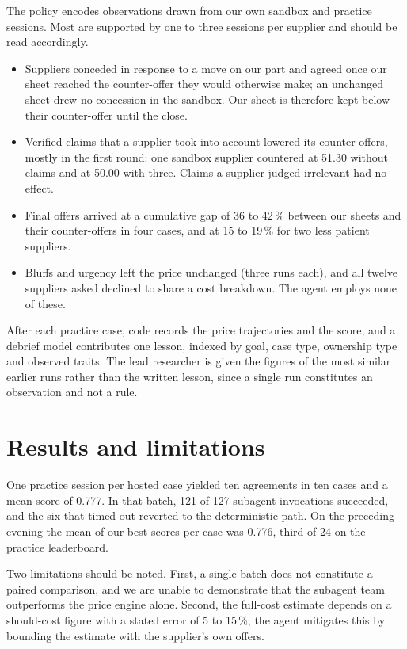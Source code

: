 \documentclass[10pt,a4paper,twocolumn]{article}
\begin{document}
The policy encodes observations drawn from our own sandbox and practice sessions. Most are
supported by one to three sessions per supplier and should be read accordingly.
\begin{itemize}
\item Suppliers conceded in response to a move on our part and agreed once our sheet reached the
  counter-offer they would otherwise make; an unchanged sheet drew no concession in the sandbox.
  Our sheet is therefore kept below their counter-offer until the close.
\item Verified claims that a supplier took into account lowered its counter-offers, mostly in the
  first round: one sandbox supplier countered at 51.30 without claims and at 50.00 with three.
  Claims a supplier judged irrelevant had no effect.
\item Final offers arrived at a cumulative gap of 36 to 42\,\% between our sheets and their
  counter-offers in four cases, and at 15 to 19\,\% for two less patient suppliers.
\item Bluffs and urgency left the price unchanged (three runs each), and all twelve suppliers
  asked declined to share a cost breakdown. The agent employs none of these.
\end{itemize}
After each practice case, code records the price trajectories and the score, and a debrief model
contributes one lesson, indexed by goal, case type, ownership type and observed traits. The lead
researcher is given the figures of the most similar earlier runs rather than the written lesson,
since a single run constitutes an observation and not a rule.

\section{Results and limitations}

One practice session per hosted case yielded ten agreements in ten cases and a mean score of
0.777. In that batch, 121 of 127 subagent invocations succeeded, and the six that timed out
reverted to the deterministic path. On the preceding evening the mean of our best scores per case was 0.776, third of 24 on the practice leaderboard.

Two limitations should be noted. First, a single batch does not constitute a paired comparison,
and we are unable to demonstrate that the subagent team outperforms the price engine alone.
Second, the full-cost estimate depends on a should-cost figure with a stated error of 5 to
15\,\%; the agent mitigates this by bounding the estimate with the supplier's own offers.
\end{document}
